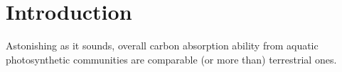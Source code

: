 \documentclass[../thesis.tex]{subfiles} %
\begin{document}
\section{Introduction}

Astonishing as it sounds, overall carbon absorption ability from aquatic photosynthetic communities are comparable (or more than) terrestrial ones.\autocite{}
\end{document}
